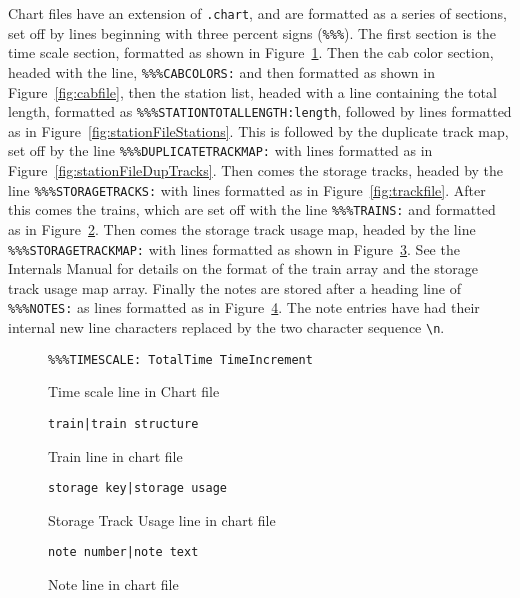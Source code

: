 Chart files have an extension of \verb=.chart=, and are formatted as a
series of sections, set off by lines beginning with three percent signs
(\verb=%%%=).  The first section is the time scale section, formatted
as shown in Figure~\ref{fig:chtimescale}.  Then the cab color section,
headed with the line, \verb=%%%CABCOLORS:= and then formatted as shown
in Figure~\ref{fig:cabfile}, then the station list, headed with a line
containing the total length, formatted as
\verb=%%%STATIONTOTALLENGTH:length=, followed by lines formatted as in
Figure~\ref{fig:stationFileStations}.  This is followed by the
duplicate track map, set off by the line \verb=%%%DUPLICATETRACKMAP:=
with lines formatted as in Figure~\ref{fig:stationFileDupTracks}.  Then
comes the storage tracks, headed by the line \verb=%%%STORAGETRACKS:=
with lines formatted as in Figure~\ref{fig:trackfile}.  After this
comes the trains, which are set off with the line \verb=%%%TRAINS:= and
formatted as in Figure~\ref{fig:chfileTrains}.  Then comes the storage
track usage map, headed by the line \verb=%%%STORAGETRACKMAP:= with
lines formatted as shown in Figure~\ref{fig:chfileStorUseMap}. See the
Internals Manual for details on the format of the train array and the
storage track usage map array.  Finally the notes are stored after a
heading line of \verb=%%%NOTES:= as lines formatted as in
Figure~\ref{fig:chfileNotes}. The note entries have had their internal
new line characters replaced by the two character sequence \verb=\n=.

\begin{figure}
\begin{centering}
\verb=%%%TIMESCALE: TotalTime TimeIncrement=\\
\caption{Time scale line in Chart file}
\label{fig:chtimescale}
\end{centering}
\end{figure}

\begin{figure}
\begin{centering}
\verb=train|train structure=\\
\caption{Train line in chart file}
\label{fig:chfileTrains}
\end{centering}
\end{figure}

\begin{figure}
\begin{centering}
\verb=storage key|storage usage=\\
\caption{Storage Track Usage line in chart file}
\label{fig:chfileStorUseMap}
\end{centering}
\end{figure}

\begin{figure}
\begin{centering}
\verb=note number|note text=\\
\caption{Note line in chart file}
\label{fig:chfileNotes}
\end{centering}
\end{figure}

